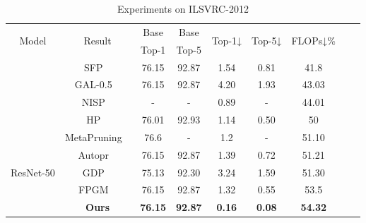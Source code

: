 \documentclass[journal,article,submit,pdftex,moreauthors]{Definitions/mdpi}
\begin{document}
\begin{table}[t]
\caption{Experiments on ILSVRC-2012}
\label{tab: ilsvrc}
\setlength{\tabcolsep}{8pt}
\renewcommand{\arraystretch}{1.3}
\begin{tabular}{@{}ccccccccc@{}}
\toprule
\multirow{2}{*}{Model}     & \multirow{2}{*}{Result}   & Base           & Base                & \multirow{2}{*}{Top-1↓} & \multirow{2}{*}{Top-5↓} & \multirow{2}{*}{FLOPs↓\%} \\
                           &                           & Top-1          & Top-5              &                         &                         &                           \\ \midrule
                           & SFP ~\cite{SFT}              & 76.15          & 92.87                 & 1.54                    & 0.81                    & 41.8                      \\
                           & GAL-0.5 ~\cite{gal}          & 76.15          & 92.87              & 4.20                    & 1.93                    & 43.03                     \\
                           & NISP ~\cite{nisp}             & -              & -                  & 0.89                    & -                       & 44.01                     \\
                           & HP ~\cite{hp}               & 76.01          & 92.93            & 1.14                    & 0.50                    & 50                        \\
                           & MetaPruning ~\cite{metap}      & 76.6           & -                  & 1.2                     & -                       & 51.10                     \\
                           & Autopr ~\cite{autop}          & 76.15          & 92.87            & 1.39                    & 0.72                    & 51.21                     \\
ResNet-50                  & GDP ~\cite{gdp}              & 75.13          & 92.30           & 3.24                    & 1.59                    & 51.30                     \\
                           & FPGM ~\cite{fpgm}             & 76.15          & 92.87            & 1.32                    & 0.55                    & 53.5                      \\
\textbf{}                  & \textbf{Ours}           & \textbf{76.15} & \textbf{92.87}  & \textbf{0.16}           & \textbf{0.08}           & \textbf{54.32}                 \\

\end{tabular}
\end{table}
\end{document}

